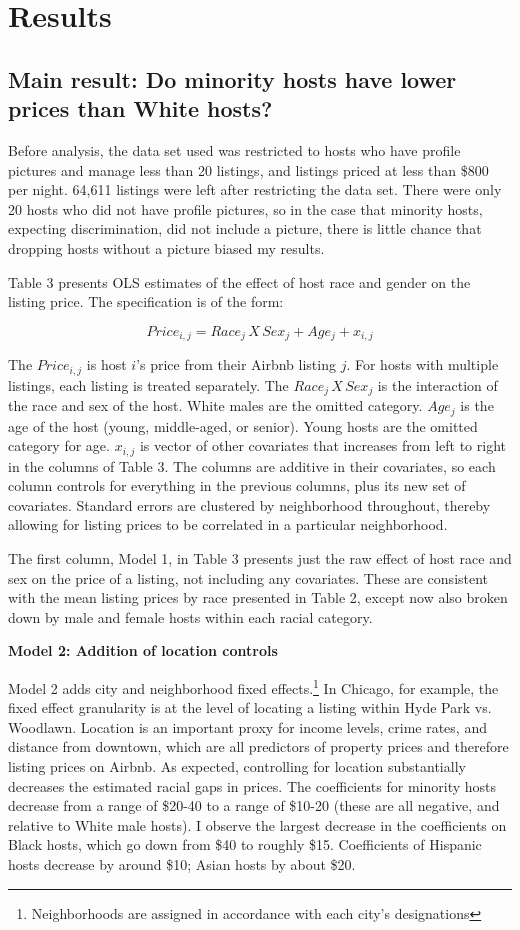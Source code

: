 \documentclass[11pt, oneside]{article}
\begin{document}
\section{Results}
\subsection{Main result: Do minority hosts have lower prices than White hosts?} %

Before analysis, the data set used was restricted to hosts who have profile pictures and manage less than 20 listings, and listings priced at less than \$800 per night. 64,611 listings were left after restricting the data set. There were only 20 hosts who did not have profile pictures, so in the case that minority hosts, expecting discrimination, did not include a picture, there is little chance that dropping hosts without a picture biased my results. 

Table 3 presents OLS estimates of the effect of host race and gender on the listing price. The specification is of the form: 

\[ Price_{i,j} = Race_{j}\,X \,Sex_j + Age_j + x_{i,j}\]

The $Price_{i,j}$ is host $i$'s price from their Airbnb listing $j$. For hosts with multiple listings, each listing is treated separately. The $Race_{j}\,X \,Sex_j$ is the interaction of the race and sex of the host. White males are the omitted category. $Age_j$ is the age of the host (young, middle-aged, or senior). Young hosts are the omitted category for age. $x_{i,j}$ is vector of other covariates that increases from left to right in the columns of Table 3. The columns are additive in their covariates, so each column controls for everything in the previous columns, plus its new set of covariates. Standard errors are clustered by neighborhood throughout, thereby allowing for listing prices to be correlated in a particular neighborhood.

The first column, Model 1, in Table 3 presents just the raw effect of host race and sex on the price of a listing, not including any covariates. These are consistent with the mean listing prices by race presented in Table 2, except now also broken down by male and female hosts within each racial category.

\textbf{Model 2: Addition of location controls}

Model 2 adds city and neighborhood fixed effects.\footnote{Neighborhoods are assigned in accordance with each city's designations} In Chicago, for example, the fixed effect granularity is at the level of locating a listing within Hyde Park vs. Woodlawn. Location is an important proxy for income levels, crime rates, and distance from downtown, which are all predictors of property prices and therefore listing prices on Airbnb. As expected, controlling for location substantially decreases the estimated racial gaps in prices. The coefficients for minority hosts decrease from a range of \$20-40 to a range of \$10-20 (these are all negative, and relative to White male hosts). I observe the largest decrease in the coefficients on Black hosts, which go down from \$40 to roughly \$15. Coefficients of Hispanic hosts decrease by around \$10; Asian hosts by about \$20. 
\end{document}
